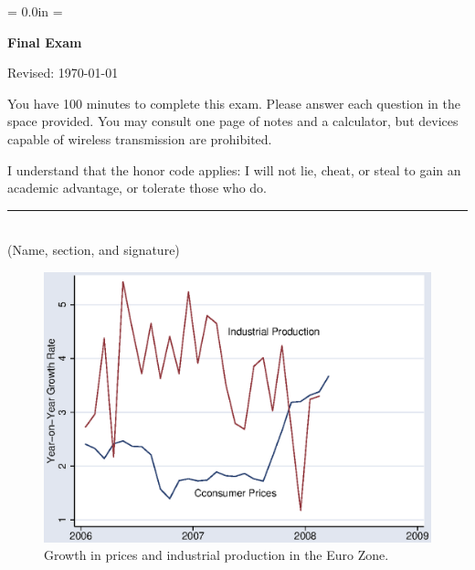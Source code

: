\documentclass[letterpaper,12pt]{article}
\def\HeadName{Final Exam}
\begin{document}
\parindent = 0.0in
\parskip = \bigskipamount
\thispagestyle{empty}%
\Head

\centerline{\large \bf \HeadName}%
\centerline{Revised:  \today}

\bigskip
You have 100 minutes to complete this exam.  Please answer each question in the space provided.
You may consult one page of notes and a calculator, but devices capable of wireless transmission
are prohibited.

I understand that the honor code applies: I will not lie, cheat, or
steal to gain an academic advantage, or tolerate those who do.

\begin{flushright}
\rule{4in}{0.5pt} \\ (Name, section, and signature)
\end{flushright}

\begin{figure}[h]
    \centering
    \includegraphics[scale=0.8]{final_08.eps}
    \caption{Growth in prices and industrial production in the 
    Euro Zone.} 
    \label{fig:ez}
\end{figure}
\end{document}
